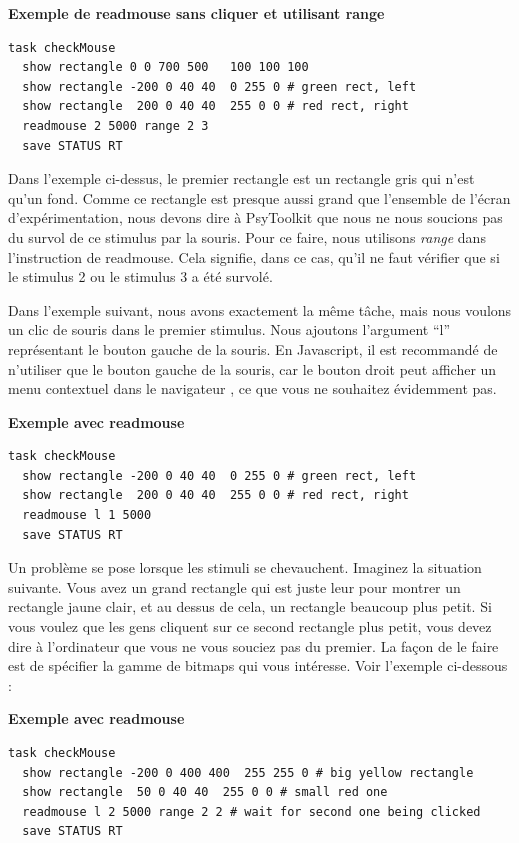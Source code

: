\documentclass[
]{book}
\begin{document}
\textbf{Exemple de readmouse sans cliquer et utilisant range}

\begin{verbatim}
task checkMouse
  show rectangle 0 0 700 500   100 100 100
  show rectangle -200 0 40 40  0 255 0 # green rect, left
  show rectangle  200 0 40 40  255 0 0 # red rect, right
  readmouse 2 5000 range 2 3
  save STATUS RT
\end{verbatim}

Dans l'exemple ci-dessus, le premier rectangle est un rectangle gris qui n'est qu'un fond. Comme ce rectangle est presque aussi grand que l'ensemble de l'écran d'expérimentation, nous devons dire à PsyToolkit que nous ne nous soucions pas du survol de ce stimulus par la souris. Pour ce faire, nous utilisons \emph{range} dans l'instruction de readmouse. Cela signifie, dans ce cas, qu'il ne faut vérifier que si le stimulus 2 ou le stimulus 3 a été survolé.

Dans l'exemple suivant, nous avons exactement la même tâche, mais nous voulons un clic de souris dans le premier stimulus. Nous ajoutons l'argument ``l'' représentant le bouton gauche de la souris. En Javascript, il est recommandé de n'utiliser que le bouton gauche de la souris, car le bouton droit peut afficher un menu contextuel dans le navigateur , ce que vous ne souhaitez évidemment pas.

\textbf{Exemple avec readmouse}

\begin{verbatim}
task checkMouse
  show rectangle -200 0 40 40  0 255 0 # green rect, left
  show rectangle  200 0 40 40  255 0 0 # red rect, right
  readmouse l 1 5000
  save STATUS RT
\end{verbatim}

Un problème se pose lorsque les stimuli se chevauchent. Imaginez la situation suivante. Vous avez un grand rectangle qui est juste leur pour montrer un rectangle jaune clair, et au dessus de cela, un rectangle beaucoup plus petit. Si vous voulez que les gens cliquent sur ce second rectangle plus petit, vous devez dire à l'ordinateur que vous ne vous souciez pas du premier. La façon de le faire est de spécifier la gamme de bitmaps qui vous intéresse. Voir l'exemple ci-dessous :

\textbf{Exemple avec readmouse}

\begin{verbatim}
task checkMouse
  show rectangle -200 0 400 400  255 255 0 # big yellow rectangle
  show rectangle  50 0 40 40  255 0 0 # small red one
  readmouse l 2 5000 range 2 2 # wait for second one being clicked
  save STATUS RT
\end{verbatim}
\end{document}
